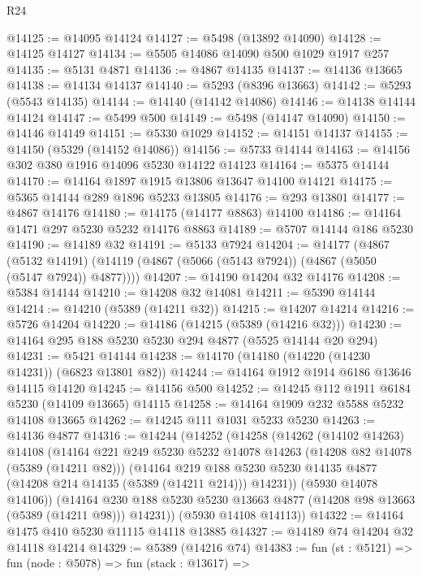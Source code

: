 \begin{lexlean}{R24}
\begin{coremodule}
@14125 := @14095 @14124
@14127 := @5498 (@13892 @14090)
@14128 := @14125 @14127
@14134 := @5505 @14086 @14090 @500 @1029 @1917 @257
@14135 := @5131 @4871
@14136 := @4867 @14135
@14137 := @14136 @13665
@14138 := @14134 @14137
@14140 := @5293 (@8396 @13663)
@14142 := @5293 (@5543 @14135)
@14144 := @14140 (@14142 @14086)
@14146 := @14138 @14144 @14124
@14147 := @5499 @500
@14149 := @5498 (@14147 @14090)
@14150 := @14146 @14149
@14151 := @5330 @1029
@14152 := @14151 @14137
@14155 := @14150 (@5329 (@14152 @14086))
@14156 := @5733 @14144
@14163 := @14156 @302 @380 @1916 @14096 @5230 @14122 @14123
@14164 := @5375 @14144
@14170 := @14164 @1897 @1915 @13806 @13647 @14100 @14121
@14175 := @5365 @14144 @289 @1896 @5233 @13805
@14176 := @293 @13801
@14177 := @4867 @14176
@14180 := @14175 (@14177 @8863) @14100
@14186 := @14164 @1471 @297 @5230 @5232 @14176 @8863
@14189 := @5707 @14144 @186 @5230
@14190 := @14189 @32
@14191 := @5133 @7924
@14204 := @14177
    (@4867
      (@5132 @14191)
      (@14119 (@4867 (@5066 (@5143 @7924)) (@4867 (@5050 (@5147 @7924)) @4877))))
@14207 := @14190 @14204 @32 @14176
@14208 := @5384 @14144
@14210 := @14208 @32 @14081
@14211 := @5390 @14144
@14214 := @14210 (@5389 (@14211 @32))
@14215 := @14207 @14214
@14216 := @5726 @14204
@14220 := @14186 (@14215 (@5389 (@14216 @32)))
@14230 := @14164 @295 @188 @5230 @5230 @294 @4877 (@5525 @14144 @20 @294)
@14231 := @5421 @14144
@14238 := @14170 (@14180 (@14220 (@14230 @14231)) (@6823 @13801 @82))
@14244 := @14164 @1912 @1914 @6186 @13646 @14115 @14120
@14245 := @14156 @500
@14252 := @14245 @112 @1911 @6184 @5230 (@14109 @13665) @14115
@14258 := @14164 @1909 @232 @5588 @5232 @14108 @13665
@14262 := @14245 @111 @1031 @5233 @5230
@14263 := @14136 @4877
@14316 := @14244
    (@14252
      (@14258
        (@14262
          (@14102 @14263)
          @14108
          (@14164
            @221
            @249
            @5230
            @5232
            @14078
            @14263
            (@14208 @82 @14078 (@5389 (@14211 @82)))
            (@14164
              @219
              @188
              @5230
              @5230
              @14135
              @4877
              (@14208 @214 @14135 (@5389 (@14211 @214)))
              @14231))
          (@5930 @14078 @14106))
        (@14164 @230 @188 @5230 @5230 @13663 @4877 (@14208 @98 @13663 (@5389 (@14211 @98))) @14231))
      (@5930 @14108 @14113))
@14322 := @14164 @1475 @410 @5230 @11115 @14118 @13885
@14327 := @14189 @74 @14204 @32 @14118 @14214
@14329 := @5389 (@14216 @74)
@14383 := fun (st : @5121) =>
  fun (node : @5078) =>
  fun (stack : @13617) =>

\end{coremodule}
\end{lexlean}

